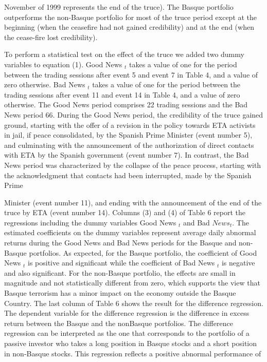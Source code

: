 \documentclass[10pt]{article}
\begin{document}
November of 1999 represents the end of the truce). The Basque portfolio outperforms the non-Basque portfolio for most of the truce period except at the beginning (when the ceasefire had not gained credibility) and at the end (when the cease-fire lost credibility).

To perform a statistical test on the effect of the truce we added two dummy variables to equation (1). Good News ${ }_{t}$ takes a value of one for the period between the trading sessions after event 5 and event 7 in Table 4, and a value of zero otherwise. Bad News ${ }_{t}$ takes a value of one for the period between the trading sessions after event 11 and event 14 in Table 4, and a value of zero otherwise. The Good News period comprises 22 trading sessions and the Bad News period 66. During the Good News period, the credibility of the truce gained ground, starting with the offer of a revision in the policy towards ETA activists in jail, if peace consolidated, by the Spanish Prime Minister (event number 5), and culminating with the announcement of the authorization of direct contacts with ETA by the Spanish government (event number 7). In contrast, the Bad News period was characterized by the collapse of the peace process, starting with the acknowledgment that contacts had been interrupted, made by the Spanish Prime

Minister (event number 11), and ending with the announcement of the end of the truce by ETA (event number 14). Columns (3) and (4) of Table 6 report the regressions including the dummy variables Good News ${ }_{t}$ and Bad $N e w s{ }_{t}$. The estimated coefficients on the dummy variables represent average daily abnormal returns during the Good News and Bad News periods for the Basque and non-Basque portfolios. As expected, for the Basque portfolio, the coefficient of Good News ${ }_{t}$ is positive and significant while the coefficient of Bad News ${ }_{t}$ is negative and also significant. For the non-Basque portfolio, the effects are small in magnitude and not statistically different from zero, which supports the view that Basque terrorism has a minor impact on the economy outside the Basque Country. The last column of Table 6 shows the result for the difference regression. The dependent variable for the difference regression is the difference in excess return between the Basque and the nonBasque portfolios. The difference regression can be interpreted as the one that corresponds to the portfolio of a passive investor who takes a long position in Basque stocks and a short position in non-Basque stocks. This regression reflects a positive abnormal performance of
\end{document}
